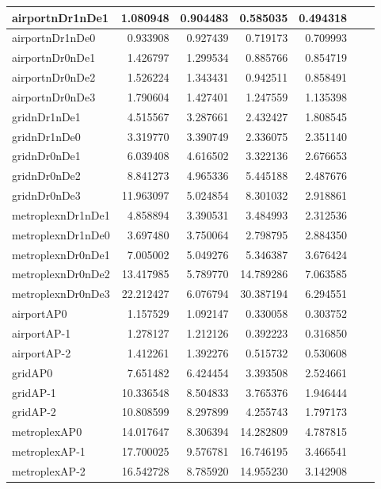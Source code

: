 \begin{longtable}{|l|r|r|r|r|r|r|}
\endlastfoot
airportnDr1nDe1 & 1.080948 & 0.904483 & 0.585035 & 0.494318 \\ \hline
airportnDr1nDe0 & 0.933908 & 0.927439 & 0.719173 & 0.709993 \\ \hline
airportnDr0nDe1 & 1.426797 & 1.299534 & 0.885766 & 0.854719 \\ \hline
airportnDr0nDe2 & 1.526224 & 1.343431 & 0.942511 & 0.858491 \\ \hline
airportnDr0nDe3 & 1.790604 & 1.427401 & 1.247559 & 1.135398 \\ \hline
gridnDr1nDe1 & 4.515567 & 3.287661 & 2.432427 & 1.808545 \\ \hline
gridnDr1nDe0 & 3.319770 & 3.390749 & 2.336075 & 2.351140 \\ \hline
gridnDr0nDe1 & 6.039408 & 4.616502 & 3.322136 & 2.676653 \\ \hline
gridnDr0nDe2 & 8.841273 & 4.965336 & 5.445188 & 2.487676 \\ \hline
gridnDr0nDe3 & 11.963097 & 5.024854 & 8.301032 & 2.918861 \\ \hline
metroplexnDr1nDe1 & 4.858894 & 3.390531 & 3.484993 & 2.312536 \\ \hline
metroplexnDr1nDe0 & 3.697480 & 3.750064 & 2.798795 & 2.884350 \\ \hline
metroplexnDr0nDe1 & 7.005002 & 5.049276 & 5.346387 & 3.676424 \\ \hline
metroplexnDr0nDe2 & 13.417985 & 5.789770 & 14.789286 & 7.063585 \\ \hline
metroplexnDr0nDe3 & 22.212427 & 6.076794 & 30.387194 & 6.294551 \\ \hline
airportAP0 & 1.157529 & 1.092147 & 0.330058 & 0.303752 \\ \hline
airportAP-1 & 1.278127 & 1.212126 & 0.392223 & 0.316850 \\ \hline
airportAP-2 & 1.412261 & 1.392276 & 0.515732 & 0.530608 \\ \hline
gridAP0 & 7.651482 & 6.424454 & 3.393508 & 2.524661 \\ \hline
gridAP-1 & 10.336548 & 8.504833 & 3.765376 & 1.946444 \\ \hline
gridAP-2 & 10.808599 & 8.297899 & 4.255743 & 1.797173 \\ \hline
metroplexAP0 & 14.017647 & 8.306394 & 14.282809 & 4.787815 \\ \hline
metroplexAP-1 & 17.700025 & 9.576781 & 16.746195 & 3.466541 \\ \hline
metroplexAP-2 & 16.542728 & 8.785920 & 14.955230 & 3.142908 \\ \hline

\end{longtable}
